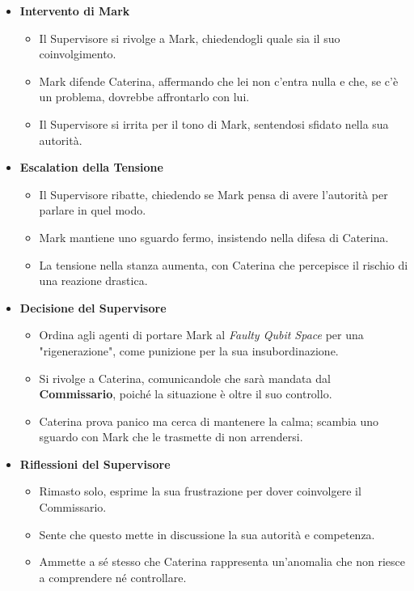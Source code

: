 \begin{itemize}
    \item \textbf{Intervento di Mark}
    \begin{itemize}
        \item Il Supervisore si rivolge a Mark, chiedendogli quale sia il suo coinvolgimento.
        \item Mark difende Caterina, affermando che lei non c'entra nulla e che, se c'è un problema, dovrebbe affrontarlo con lui.
        \item Il Supervisore si irrita per il tono di Mark, sentendosi sfidato nella sua autorità.
    \end{itemize}
    \item \textbf{Escalation della Tensione}
    \begin{itemize}
        \item Il Supervisore ribatte, chiedendo se Mark pensa di avere l'autorità per parlare in quel modo.
        \item Mark mantiene uno sguardo fermo, insistendo nella difesa di Caterina.
        \item La tensione nella stanza aumenta, con Caterina che percepisce il rischio di una reazione drastica.
    \end{itemize}
    \item \textbf{Decisione del Supervisore}
    \begin{itemize}
        \item Ordina agli agenti di portare Mark al \emph{Faulty Qubit Space} per una "rigenerazione", come punizione per la sua insubordinazione.
        \item Si rivolge a Caterina, comunicandole che sarà mandata dal \textbf{Commissario}, poiché la situazione è oltre il suo controllo.
        \item Caterina prova panico ma cerca di mantenere la calma; scambia uno sguardo con Mark che le trasmette di non arrendersi.
    \end{itemize}
\end{itemize}



\begin{itemize}
    \item \textbf{Riflessioni del Supervisore}
    \begin{itemize}
        \item Rimasto solo, esprime la sua frustrazione per dover coinvolgere il Commissario.
        \item Sente che questo mette in discussione la sua autorità e competenza.
        \item Ammette a sé stesso che Caterina rappresenta un'anomalia che non riesce a comprendere né controllare.
    \end{itemize}
\end{itemize}



